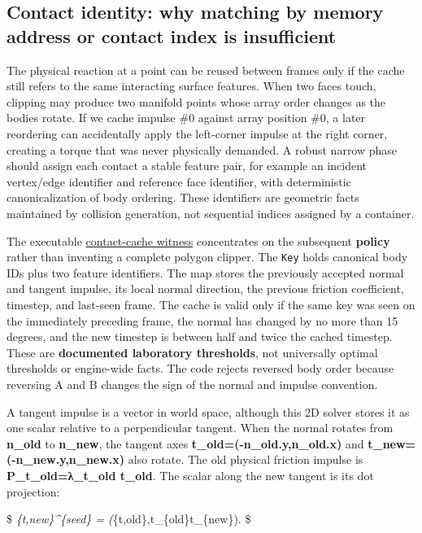 \subsection{Contact identity: why matching by memory address or contact index is insufficient}\label{appendix-c9d92e145503-contact-identity-why-matching-by-memory-address-or-contact-index-is-insufficient}

The physical reaction at a point can be reused between frames only if the cache still refers to the same interacting surface features. When two faces touch, clipping may produce two manifold points whose array order changes as the bodies rotate. If we cache impulse \#0 against array position \#0, a later reordering can accidentally apply the left-corner impulse at the right corner, creating a torque that was never physically demanded. A robust narrow phase should assign each contact a stable feature pair, for example an incident vertex/edge identifier and reference face identifier, with deterministic canonicalization of body ordering. These identifiers are geometric facts maintained by collision generation, not sequential indices assigned by a container.

The executable \hyperref[source-file-830b13449e1c6505af693753]{contact-cache witness} concentrates on the subsequent \textbf{policy} rather than inventing a complete polygon clipper. The \texttt{Key} holds canonical body IDs plus two feature identifiers. The map stores the previously accepted normal and tangent impulse, its local normal direction, the previous friction coefficient, timestep, and last-seen frame. The cache is valid only if the same key was seen on the immediately preceding frame, the normal has changed by no more than 15 degrees, and the new timestep is between half and twice the cached timestep. These are \textbf{documented laboratory thresholds}, not universally optimal thresholds or engine-wide facts. The code rejects reversed body order because reversing A and B changes the sign of the normal and impulse convention.

A tangent impulse is a vector in world space, although this 2D solver stores it as one scalar relative to a perpendicular tangent. When the normal rotates from \textbf{n\_old} to \textbf{n\_new}, the tangent axes \textbf{t\_old=(-n\_old.y,n\_old.x)} and \textbf{t\_new=(-n\_new.y,n\_new.x)} also rotate. The old physical friction impulse is \textbf{P\_t\_old=λ\_t\_old t\_old}. The scalar along the new tangent is its dot projection:

\$ \lambda\emph{\{t,new\}\^{}\{seed\} =  \left(\lambda}\{t,old\},\mathbf t\_\{old\}\cdot\mathbf t\_\{new\}\right). \$

